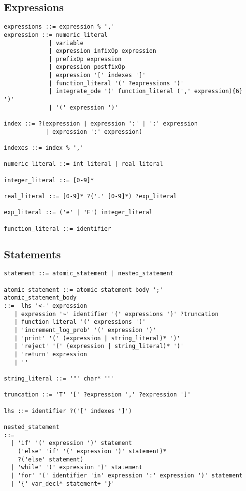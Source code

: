 \subsection{Expressions}

{
\small
\begin{Verbatim}[fontsize=\small]
expressions ::= expression % ','
expression ::= numeric_literal
             | variable
             | expression infixOp expression
             | prefixOp expression
             | expression postfixOp
             | expression '[' indexes ']'
             | function_literal '(' ?expressions ')'
             | integrate_ode '(' function_literal (',' expression){6} ')'
             | '(' expression ')'

index ::= ?(expression | expression ':' | ':' expression
            | expression ':' expression)

indexes ::= index % ','

numeric_literal ::= int_literal | real_literal

integer_literal ::= [0-9]*

real_literal ::= [0-9]* ?('.' [0-9]*) ?exp_literal

exp_literal ::= ('e' | 'E') integer_literal

function_literal ::= identifier
\end{Verbatim}
}

\subsection{Statements}

{
\small
\begin{Verbatim}[fontsize=\small]
statement ::= atomic_statement | nested_statement

atomic_statement ::= atomic_statement_body ';'
atomic_statement_body
::=  lhs '<-' expression
   | expression '~' identifier '(' expressions ')' ?truncation
   | function_literal '(' expressions ')'
   | 'increment_log_prob' '(' expression ')'
   | 'print' '(' (expression | string_literal)* ')'
   | 'reject' '(' (expression | string_literal)* ')'
   | 'return' expression
   | ''

string_literal ::= '"' char* '"'

truncation ::= 'T' '[' ?expression ',' ?expression ']'

lhs ::= identifier ?('[' indexes ']')

nested_statement
::=
  | 'if' '(' expression ')' statement
    ('else' 'if' '(' expression ')' statement)*
    ?('else' statement)
  | 'while' '(' expression ')' statement
  | 'for' '(' identifier 'in' expression ':' expression ')' statement
  | '{' var_decl* statement+ '}'
\end{Verbatim}
%
}

